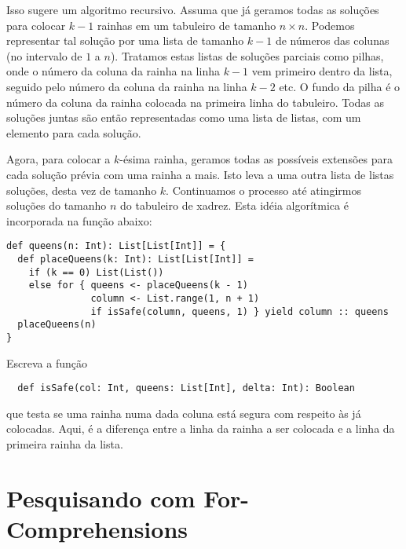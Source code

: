 Isso sugere um algoritmo recursivo. Assuma que já geramos todas as soluções para colocar $k-1$ rainhas em
um tabuleiro de tamanho $n \times n$. Podemos representar tal solução por uma lista de tamanho $k-1$ de 
números das colunas (no intervalo de $1$ a $n$). Tratamos estas listas de soluções parciais como pilhas,
onde o número da coluna da rainha na linha $k-1$ vem primeiro dentro da lista, seguido pelo número da 
coluna da rainha na linha $k-2$ etc. O fundo da pilha é o número da coluna da rainha colocada na 
primeira linha do tabuleiro. Todas as soluções juntas são então representadas como uma lista de listas, 
com um elemento para cada solução.

Agora, para colocar a $k$-ésima rainha, geramos todas as possíveis extensões para cada solução prévia com uma 
rainha a mais. Isto leva a uma outra lista de listas soluções, desta vez de tamanho $k$. Continuamos o processo
até atingirmos soluções do tamanho $n$ do tabuleiro de xadrez. Esta idéia algorítmica é incorporada na 
função  abaixo: 

\begin{lstlisting}
def queens(n: Int): List[List[Int]] = {
  def placeQueens(k: Int): List[List[Int]] =
    if (k == 0) List(List())
    else for { queens <- placeQueens(k - 1)
               column <- List.range(1, n + 1)
               if isSafe(column, queens, 1) } yield column :: queens
  placeQueens(n)
}
\end{lstlisting}

\begin{exercise} Escreva a função 
\begin{lstlisting}
  def isSafe(col: Int, queens: List[Int], delta: Int): Boolean
\end{lstlisting}
que testa se uma rainha numa dada coluna \verb@col@ está segura com respeito às \verb@queens@ já colocadas.
Aqui, \verb@delta@ é a diferença entre a linha da rainha a ser colocada e a linha da primeira rainha da lista.
\end{exercise}

\section{Pesquisando com For-Comprehensions}

